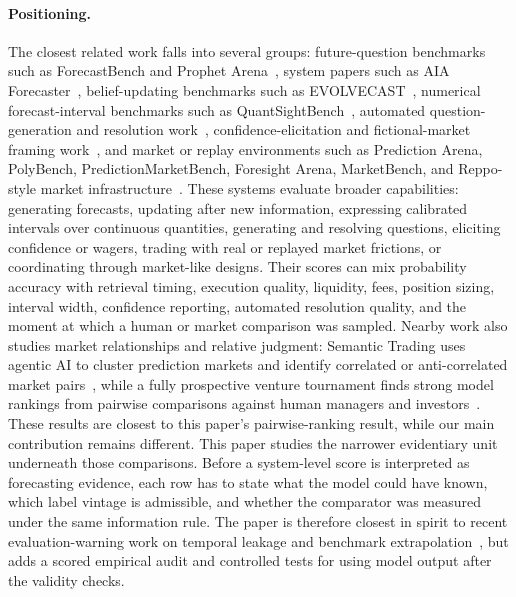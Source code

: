 \documentclass[11pt]{article}
\begin{document}
\paragraph{Positioning.} The closest related work falls into several groups: future-question benchmarks such as ForecastBench and Prophet Arena~\cite{karger2024forecastbench,yang2025prophetarena}, system papers such as AIA Forecaster~\cite{alur2025aiaforecaster}, belief-updating benchmarks such as EVOLVECAST~\cite{yuan2025evolvecast}, numerical forecast-interval benchmarks such as QuantSightBench~\cite{qin2026quantsightbench}, automated question-generation and resolution work~\cite{bosse2026automatingforecasting}, confidence-elicitation and fictional-market framing work~\cite{xiong2024confidence,todasco2025fakepredictionmarkets}, and market or replay environments such as Prediction Arena, PolyBench, PredictionMarketBench, Foresight Arena, MarketBench, and Reppo-style market infrastructure~\cite{zhang2026predictionarena,cheng2026polybench,arora2026predictionmarketbench,nechepurenko2026foresight,fradkin2026marketbench,reppo2026}. These systems evaluate broader capabilities: generating forecasts, updating after new information, expressing calibrated intervals over continuous quantities, generating and resolving questions, eliciting confidence or wagers, trading with real or replayed market frictions, or coordinating through market-like designs. Their scores can mix probability accuracy with retrieval timing, execution quality, liquidity, fees, position sizing, interval width, confidence reporting, automated resolution quality, and the moment at which a human or market comparison was sampled. Nearby work also studies market relationships and relative judgment: Semantic Trading uses agentic AI to cluster prediction markets and identify correlated or anti-correlated market pairs~\cite{capponi2025semantictrading}, while a fully prospective venture tournament finds strong model rankings from pairwise comparisons against human managers and investors~\cite{csaszar2026strategicforesight}. These results are closest to this paper's pairwise-ranking result, while our main contribution remains different. This paper studies the narrower evidentiary unit underneath those comparisons. Before a system-level score is interpreted as forecasting evidence, each row has to state what the model could have known, which label vintage is admissible, and whether the comparator was measured under the same information rule. The paper is therefore closest in spirit to recent evaluation-warning work on temporal leakage and benchmark extrapolation~\cite{paleka2025pitfalls}, but adds a scored empirical audit and controlled tests for using model output after the validity checks.
\end{document}
